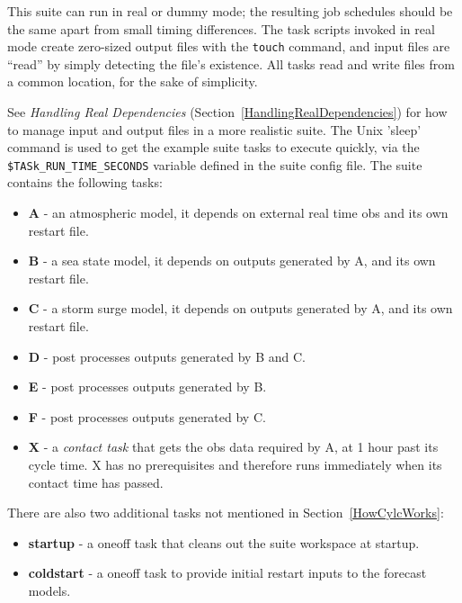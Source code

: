 

This suite can run in real or dummy mode; the resulting job schedules
should be the same apart from small timing differences.  The task
scripts invoked in real mode create zero-sized output files with the
\lstinline=touch= command, and input files are ``read'' by simply
detecting the file's existence.  All tasks read and write files from a
common location, for the sake of simplicity. 

See {\em Handling Real Dependencies}
(Section~\ref{HandlingRealDependencies}) for how to manage input and
output files in a more realistic suite.  The Unix 'sleep' command is
used to get the example suite tasks to execute quickly, via the 
\lstinline=$TASk_RUN_TIME_SECONDS= variable defined in the suite config
file.  The suite contains the following tasks:

\begin{itemize}
    \item {\bf A} - an atmospheric model, it depends on external real
        time obs and its own restart file.
    \item {\bf B} - a sea state model, it depends on outputs generated
        by A, and its own restart file.
    \item {\bf C} - a storm surge model, it depends on outputs generated
        by A, and its own restart file.
    \item {\bf D} - post processes outputs generated by B and C.
    \item {\bf E} - post processes outputs generated by B.
    \item {\bf F} - post processes outputs generated by C.
    \item {\bf X} - a {\em contact task} that gets the obs data required
    by A, at 1 hour past its cycle time. X has no prerequisites and
    therefore runs immediately when its contact time has passed.
\end{itemize}

There are also two additional tasks not mentioned in Section~\ref{HowCylcWorks}:

\begin{itemize}
    \item {\bf startup} - a oneoff task that cleans out the suite
    workspace at startup.
    \item {\bf coldstart} - a oneoff task to provide initial restart
        inputs to the forecast models. 
\end{itemize}

